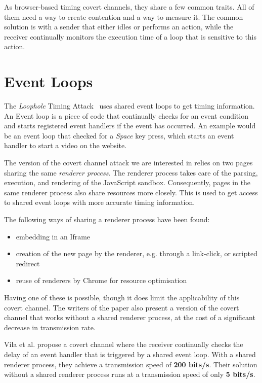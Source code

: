 \documentclass[11pt,
  titlepage=false,
]{scrreprt}
\begin{document}
As browser-based timing covert channels, they share a few common traits.
All of them need a way to create contention and a way to measure it.
The common solution is with a sender that either idles or performs an action,
while the receiver continually monitors the execution time of a loop that is sensitive to this action.

\section{Event Loops}
The \textit{Loophole} Timing Attack~\cite{vila2017loophole} uses shared event loops to get timing information.
An Event loop is a piece of code that continually checks for an event condition
and starts registered event handlers if the event has occurred.
An example would be an event loop that checked for a \textit{Space} key press,
which starts an event handler to start a video on the website.

The version of the covert channel attack we are interested in relies on two pages sharing the same \textit{renderer process}.
The renderer process takes care of the parsing, execution, and rendering of the JavaScript sandbox.
Consequently, pages in the same renderer process also share resources more closely.
This is used to get access to shared event loops with more accurate timing information.

The following ways of sharing a renderer process have been found:

\begin{itemize}
    \item embedding in an Iframe
    \item creation of the new page by the renderer, e.g. through a link-click, or scripted redirect
    \item reuse of renderers by Chrome for resource optimisation
\end{itemize}

Having one of these is possible, though it does limit the applicability of this covert channel.
The writers of the paper also present a version of the covert channel that works without a shared renderer process,
at the cost of a significant decrease in transmission rate.

Vila et al. propose a covert channel where the receiver continually checks the delay of an event handler
that is triggered by a shared event loop.
With a shared renderer process, they achieve a transmission speed of \textbf{200 bits/s}.
Their solution without a shared renderer process runs at a transmission speed of only \textbf{5 bits/s}.
\end{document}
